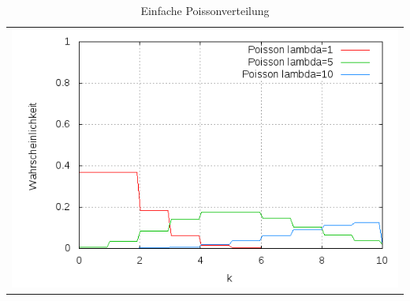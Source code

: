 \begin{table}[h]
	\centering
	\begin{tabular}{c}
		\includegraphics[scale=0.5]{pics/poisson_basic}
	\end{tabular}
	\caption{Einfache Poissonverteilung}
	\label{tab:poisson_basic}
\end{table}
